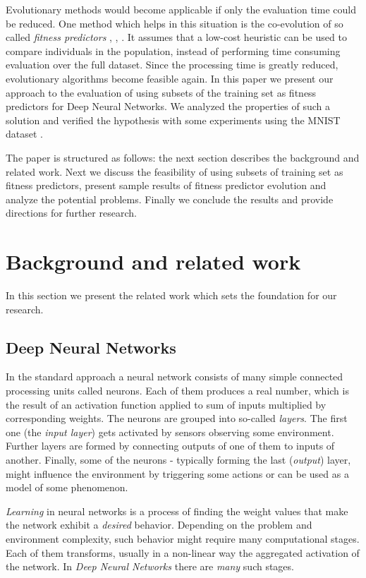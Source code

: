 \documentclass{llncs}
\begin{document}
Evolutionary methods would become applicable if only the evaluation time could be reduced. One method which helps in this situation is the co-evolution of so called \emph{fitness predictors} \cite{Schmidt2006}, \cite{Schmidt2008}, \cite{Funika2014}. It assumes that a low-cost heuristic can be used to compare individuals in the population, instead of performing time consuming evaluation over the full dataset. Since the processing time is greatly reduced, evolutionary algorithms become feasible again. In this paper we present our approach to the evaluation of using subsets of the training set as fitness predictors for Deep Neural Networks. We analyzed the properties of such a solution and verified the hypothesis with some experiments using the MNIST dataset \cite{lecun-mnisthandwrittendigit-2010}. 

The paper is structured as follows: the next section describes the background and related work. Next we discuss the feasibility of using subsets of training set as fitness predictors, present sample results of fitness predictor evolution and analyze the potential problems. Finally we conclude the results and provide directions for further research.

\section{Background and related work}

In this section we present the related work which sets the foundation for our research.

\subsection{Deep Neural Networks}

In the standard approach a neural network consists of many simple connected processing units called neurons. Each of them produces a real number, which is the result of an activation function applied to sum of inputs multiplied by corresponding weights. The neurons are grouped into so-called \emph{layers}. The first one (the \emph{input layer}) gets activated by sensors observing some environment. Further layers are formed by connecting outputs of one of them to inputs of another. Finally, some of the neurons - typically forming the last (\emph{output}) layer, might influence the environment by triggering some actions or can be used as a model of some phenomenon. 

\emph{Learning} in neural networks is a process of finding the weight values that make the network exhibit a \emph{desired} behavior. Depending on the problem and environment complexity, such behavior might require many computational stages. Each of them transforms, usually in a non-linear way the aggregated activation of the network. In \emph{Deep Neural Networks} there are \emph{many} such stages. 
\end{document}
